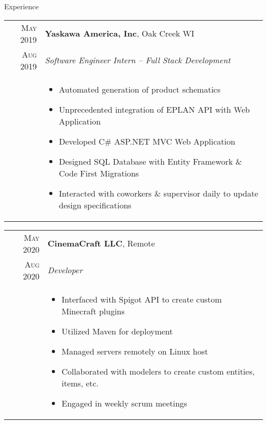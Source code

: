 \documentclass{resume}
\begin{document}
\begin{rSection}{Experience}
\small
{
    \begin{tabular}{r|p{15cm}}
        \textsc{May 2019} & \textbf{Yaskawa America, Inc}, Oak Creek WI \\
        \textsc{Aug 2019}  & \textit{Software Engineer Intern – Full Stack Development} \\ &
        \begin{itemize}
            \item {Automated generation of product schematics}
            \item {Unprecedented integration of EPLAN API with Web Application}
            \item {Developed C\# ASP.NET MVC Web Application}
            \item {Designed SQL Database with Entity Framework \& Code First Migrations}
            \item {Interacted with coworkers \& supervisor daily to update design specifications}
        \end{itemize}
    \end{tabular}

    \begin{tabular}{r|p{15cm}}
        \textsc{May 2020} & \textbf{CinemaCraft LLC}, Remote \\
        \textsc{Aug 2020}  & \textit{Developer} \\ &
        \begin{itemize}
            \item {Interfaced with Spigot API to create custom Minecraft plugins}
            \item {Utilized Maven for deployment}
            \item {Managed servers remotely on Linux host}
            \item {Collaborated with modelers to create custom entities, items, etc.}
            \item {Engaged in weekly scrum meetings}
        \end{itemize}
    \end{tabular}

}
\end{rSection}
\end{document}
